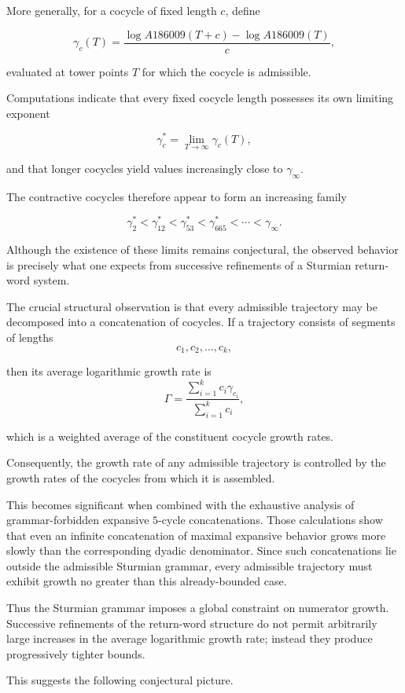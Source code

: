 \documentclass[12pt, oneside]{article}
\numberwithin{equation}{section}
\theoremstyle{definition}
\theoremstyle{plain}
\theoremstyle{remark}
\begin{document}
More generally, for a cocycle of fixed length $c$, define

\[
\gamma_c(T) = \frac{ \log A186009(T+c) - \log A186009(T) }{c},
\]

evaluated at tower points $T$ for which the cocycle is admissible.

Computations indicate that every fixed cocycle length possesses its own
limiting exponent

\[
\gamma_c^\ast = \lim_{T\to\infty} \gamma_c(T),
\]

and that longer cocycles yield values increasingly close to
$\gamma_\infty$.

The contractive cocycles therefore appear to form an increasing family

\[
\gamma_2^\ast
<
\gamma_{12}^\ast
<
\gamma_{53}^\ast
<
\gamma_{665}^\ast
<
\cdots
<
\gamma_\infty.
\]

Although the existence of these limits remains conjectural, the observed
behavior is precisely what one expects from successive refinements of a
Sturmian return-word system.

The crucial structural observation is that every admissible trajectory may
be decomposed into a concatenation of cocycles. If a trajectory consists of
segments of lengths
\[
c_1,c_2,\ldots,c_k,
\]

then its average logarithmic growth rate is
\[
\Gamma = \frac{\sum_{i=1}^{k} c_i \gamma_{c_i}}{\sum_{i=1}^{k} c_i},
\]

which is a weighted average of the constituent cocycle growth rates.

Consequently, the growth rate of any admissible trajectory is controlled by
the growth rates of the cocycles from which it is assembled.

This becomes significant when combined with the exhaustive analysis of
grammar-forbidden expansive $5$-cycle concatenations. Those calculations
show that even an infinite concatenation of maximal expansive behavior grows
more slowly than the corresponding dyadic denominator. Since such
concatenations lie outside the admissible Sturmian grammar, every admissible
trajectory must exhibit growth no greater than this already-bounded case.

Thus the Sturmian grammar imposes a global constraint on numerator growth.
Successive refinements of the return-word structure do not permit arbitrarily
large increases in the average logarithmic growth rate; instead they produce
progressively tighter bounds.

This suggests the following conjectural picture.
\end{document}
